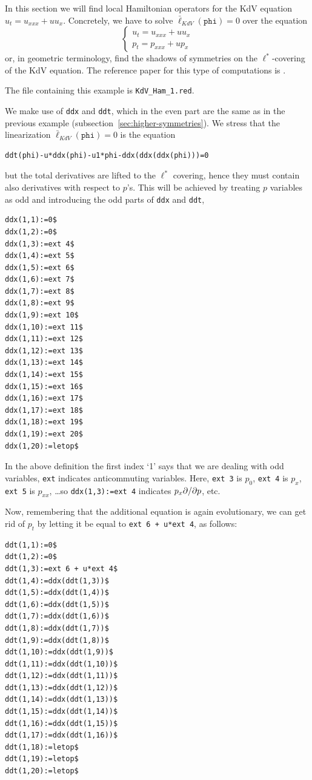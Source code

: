 In this section we will find local Hamiltonian operators for the KdV equation
$u_t=u_{xxx}+uu_x$. Concretely, we have to solve $\bar
\ell_{KdV}(\mathtt{phi})=0$ over the equation
\[
  \left\{\begin{array}{l}
    u_t=u_{xxx}+uu_x\\
    p_t=p_{xxx}+up_x
  \end{array}\right.
\]
or, in geometric terminology, find the shadows of symmetries on the
$\ell^*$-covering of the KdV equation. The reference paper for this type of
computations is \cite{KerstenKrasilshchikVerboretsky:2004}.

The file containing this example is \texttt{KdV\_Ham\_1.red}.

We make use of \texttt{ddx} and \texttt{ddt}, which in the even part are the
same as in the previous example (subsection~\ref{sec:higher-symmetries}).  We
stress that the linearization $\bar \ell_{KdV}(\mathtt{phi})=0$ is the equation
\begin{verbatim}
ddt(phi)-u*ddx(phi)-u1*phi-ddx(ddx(ddx(phi)))=0
\end{verbatim}
but the total derivatives are lifted to the $\ell^*$ covering, hence they must
contain also derivatives with respect to $p$'s. This will be achieved by
treating $p$ variables as odd and introducing the odd parts of \texttt{ddx} and
\texttt{ddt},
\begin{verbatim}
ddx(1,1):=0$
ddx(1,2):=0$
ddx(1,3):=ext 4$
ddx(1,4):=ext 5$
ddx(1,5):=ext 6$
ddx(1,6):=ext 7$
ddx(1,7):=ext 8$
ddx(1,8):=ext 9$
ddx(1,9):=ext 10$
ddx(1,10):=ext 11$
ddx(1,11):=ext 12$
ddx(1,12):=ext 13$
ddx(1,13):=ext 14$
ddx(1,14):=ext 15$
ddx(1,15):=ext 16$
ddx(1,16):=ext 17$
ddx(1,17):=ext 18$
ddx(1,18):=ext 19$
ddx(1,19):=ext 20$
ddx(1,20):=letop$
\end{verbatim}
In the above definition the first index `1' says that we are dealing with odd
variables, \texttt{ext} indicates anticommuting variables. Here, \texttt{ext 3}
is $p_0$, \texttt{ext 4} is $p_x$, \texttt{ext 5} is $p_{xx}$, \dots so
\texttt{ddx(1,3):=ext 4} indicates $p_x\pd{}{p}$, etc.

Now, remembering that the additional equation is again evolutionary, we can get
rid of $p_t$ by letting it be equal to \texttt{ext 6 + u*ext 4}, as follows:
\begin{verbatim}
ddt(1,1):=0$
ddt(1,2):=0$
ddt(1,3):=ext 6 + u*ext 4$
ddt(1,4):=ddx(ddt(1,3))$
ddt(1,5):=ddx(ddt(1,4))$
ddt(1,6):=ddx(ddt(1,5))$
ddt(1,7):=ddx(ddt(1,6))$
ddt(1,8):=ddx(ddt(1,7))$
ddt(1,9):=ddx(ddt(1,8))$
ddt(1,10):=ddx(ddt(1,9))$
ddt(1,11):=ddx(ddt(1,10))$
ddt(1,12):=ddx(ddt(1,11))$
ddt(1,13):=ddx(ddt(1,12))$
ddt(1,14):=ddx(ddt(1,13))$
ddt(1,15):=ddx(ddt(1,14))$
ddt(1,16):=ddx(ddt(1,15))$
ddt(1,17):=ddx(ddt(1,16))$
ddt(1,18):=letop$
ddt(1,19):=letop$
ddt(1,20):=letop$
\end{verbatim}

